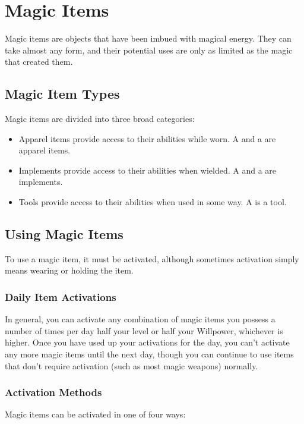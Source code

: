 \chapter{Magic Items}

Magic items are objects that have been imbued with magical energy. They can take almost any form, and their potential uses are only as limited as the magic that created them.

\section{Magic Item Types}
Magic items are divided into three broad categories:
\begin{itemize}
    \item Apparel items provide access to their abilities while worn.
        A  and a  are apparel items.
    \item Implements provide access to their abilities when wielded.
        A  and a  are implements.
    \item Tools provide access to their abilities when used in some way.
        A  is a tool.
\end{itemize}

\section{Using Magic Items}

To use a magic item, it must be activated, although sometimes activation simply means wearing or holding the item.

\subsection{Daily Item Activations}
In general, you can activate any combination of magic items you possess a number of times per day half your level or half your Willpower, whichever is higher.
Once you have used up your activations for the day, you can't activate any more magic items until the next day, though you can continue to use items that don't require activation (such as most magic weapons) normally.

\subsection{Activation Methods}
Magic items can be activated in one of four ways:

